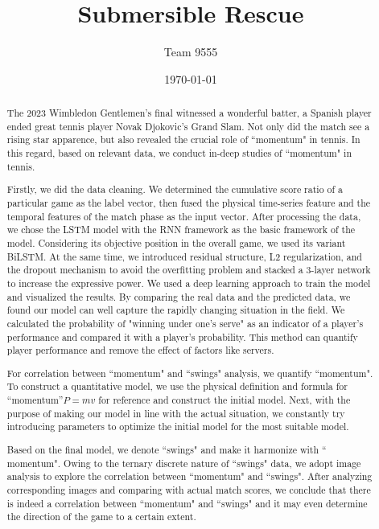 \documentclass{mcmthesis}  %
\title{Submersible Rescue}  %
\author{\small Team 9555}  %
\date{\today}  %
\begin{document}
\begin{abstract}  %

	The 2023 Wimbledon \cite{vaswani2017attention} Gentlemen’s final witnessed a wonderful batter, a Spanish player ended great tennis player Novak Djokovic's Grand Slam. Not only did the match see a rising star apparence, but also revealed the crucial role of ``momentum" in tennis. In this regard, based on relevant data, we conduct in-deep studies of ``momentum" in tennis.

	Firstly, we did the data cleaning. We determined the cumulative score ratio of a particular game as the label vector, then fused the physical time-series feature and the temporal features of the match phase as the input vector. After processing the data, we chose the LSTM model with the RNN framework as the basic framework of the model. Considering its objective position in the overall game, we used its variant BiLSTM. At the same time, we introduced residual structure, L2 regularization, and the dropout mechanism to avoid the overfitting problem and stacked a 3-layer network to increase the expressive power. We used a deep learning approach to train the model and visualized the results. By comparing the real data and the predicted data, we found our model can well capture the rapidly changing situation in the field. We calculated the probability of "winning under one's serve" as an indicator of a player's performance and compared it with a player’s probability. This method can quantify player performance and remove the effect of factors like servers.

	For correlation between ``momentum" and ``swings" analysis, we quantify ``momentum". To construct a quantitative model, we use the physical definition and formula for ``momentum''$P=mv$ for reference and construct the initial model. Next, with the purpose of  making our model in line with the actual situation, we constantly try introducing parameters to optimize the initial model for the most suitable model.

	Based on the final model, we denote ``swings" and make it harmonize with `` momentum".  Owing to the ternary discrete nature of ``swings"  data, we adopt  image analysis to explore the correlation between ``momentum" and ``swings".  After analyzing corresponding images and comparing with actual match scores, we conclude that there is indeed a correlation between ``momentum" and ``swings" and it may even determine the direction of the game to a certain extent.


\end{abstract}
\end{document}
